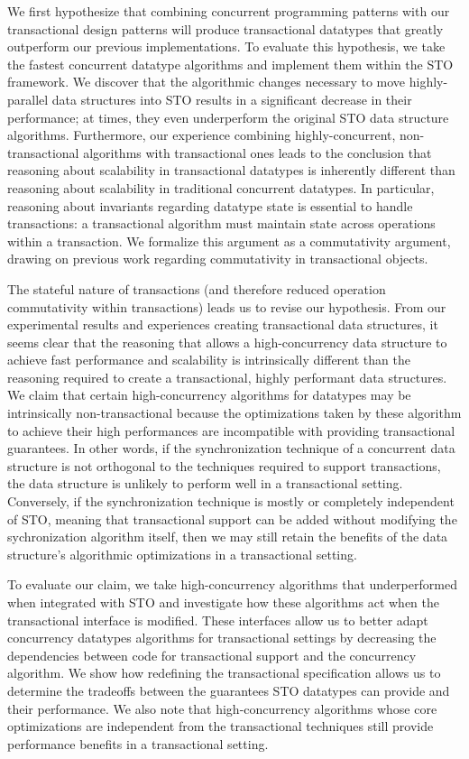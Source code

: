 We first hypothesize that combining concurrent programming patterns with our transactional design patterns will produce transactional datatypes that greatly outperform our previous implementations. To evaluate this hypothesis, we take the fastest concurrent datatype algorithms and implement them within the STO framework. We discover that the algorithmic changes necessary to move highly-parallel data structures into STO results in a significant decrease in their performance; at times, they even underperform the original STO data structure algorithms. Furthermore, our experience combining highly-concurrent, non-transactional algorithms with transactional ones leads to the conclusion that reasoning about scalability in transactional datatypes is inherently different than reasoning about scalability in traditional concurrent datatypes. In particular, reasoning about invariants regarding datatype state is essential to handle transactions: a transactional algorithm must maintain state across operations within a transaction. We formalize this argument as a commutativity argument, drawing on previous work regarding commutativity in transactional objects\cite{weihl}.

The stateful nature of transactions (and therefore reduced operation commutativity within transactions) leads us to revise our hypothesis. From our experimental results and experiences creating transactional data structures, it seems clear that the reasoning that allows a high-concurrency data structure to achieve fast performance and scalability is intrinsically different than the reasoning required to create a transactional, highly performant data structures. 
We claim that certain high-concurrency algorithms for datatypes may be intrinsically non-transactional because the optimizations taken by these algorithm to achieve their high performances are incompatible with providing transactional guarantees. In other words, if the synchronization technique of a concurrent data structure is not orthogonal to the techniques required to support transactions, the data structure is unlikely to perform well in a transactional setting. Conversely, if the synchronization technique is mostly or completely independent of STO, meaning that transactional support can be added without modifying the sychronization algorithm itself, then we may still retain the benefits of the data structure's algorithmic optimizations in a transactional setting.

To evaluate our claim, we take high-concurrency algorithms that underperformed when integrated with STO and investigate how these algorithms act when the transactional interface is modified. These interfaces allow us to better adapt concurrency datatypes algorithms for transactional settings by decreasing the dependencies between code for transactional support and the concurrency algorithm.
We show how redefining the transactional specification allows us to determine the tradeoffs between the guarantees STO datatypes can provide and their performance. We also note that high-concurrency algorithms whose core optimizations are independent from the transactional techniques still provide performance benefits in a transactional setting.

